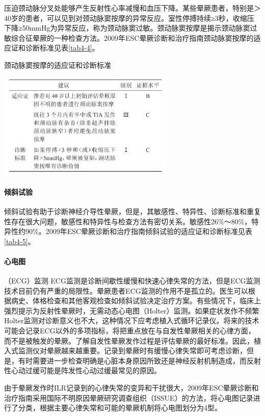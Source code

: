 压迫颈动脉分叉处能够产生反射性心率减慢和血压下降。某些晕厥患者，特别是＞
40岁的患者，可以见到对颈动脉窦按摩的异常反应。室性停搏持续≥3秒，收缩压下降≥50mmHg为异常反应，称为颈动脉窦过敏。颈动脉窦按摩是揭示颈动脉窦过敏综合征晕厥的一种检查方法。2009年ESC晕厥诊断和治疗指南颈动脉窦按摩的适应证和诊断标准见表\ref{tab4-4}。

\begin{table}[htbp]
\centering
\caption{颈动脉窦按摩的适应证和诊断标准}
\label{tab4-4}
\includegraphics[width=3.34375in,height=1.98958in]{./images/Image00021.jpg}
\end{table}

\paragraph{倾斜试验}

倾斜试验有助于诊断神经介导性晕厥，但是，其敏感性、特异性、诊断标准和重复性存在很大问题，敏感性和特异性与检查方法有密切关系。敏感性26\%～80\%，特异性约90\%。2009年ESC晕厥诊断和治疗指南倾斜试验的适应证和诊断标准见表\ref{tab4-5}。

\paragraph{心电图}

（ECG）监测
ECG监测是诊断间歇性缓慢和快速心律失常的方法，但是ECG监测技术目前仍有严重的局限性。晕厥患者ECG监测的作用不是孤立的。医生可以根据病史、体格检查和其他客观检查如倾斜试验决定治疗方案。有些情况下，临床上强烈提示为反射性晕厥时，无需动态心电图（Holter）监测。如果症状发作不频繁Holter监测对诊断意义也不大，这种情况下应考虑植入式循环记录仪。将来的技术可能会记录ECG以外的多项指标，将把重点放在与自发性晕厥相关的心律方面，而不是被触发的晕厥。了解自发性晕厥发作过程是评估晕厥的最好标准。因此，植入式监测仪对晕厥越来越重要。记录到晕厥时有缓慢心律失常即可考虑诊断，但是，有时需要进一步检查明确是心脏本身原因所致还是神经反射机制造成，而反射性心动过缓可能是阵发性心动过缓最常见的原因。

由于晕厥发作时ILR记录到的心律失常的变异和干扰很大，2009年ESC晕厥诊断和治疗指南采用国际不明原因晕厥研究调查组织（ISSUE）的方法，将心电图记录进行了分类，根据主要心律失常和可能的晕厥机制将心电图划分为4型。

